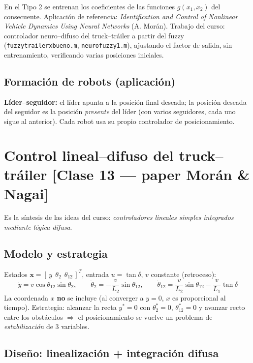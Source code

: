 \documentclass[11pt,a4paper]{article}
\begin{document}
En el Tipo 2 se entrenan los coeficientes de las funciones $g(x_1,x_2)$ del consecuente. Aplicación de referencia: \emph{Identification and Control of Nonlinear Vehicle Dynamics Using Neural Networks} (A. Morán). Trabajo del curso: controlador neuro--difuso del truck--tráiler a partir del fuzzy (\texttt{fuzzytrailerxbueno.m}, \texttt{neurofuzzy1.m}), ajustando el factor de salida, sin entrenamiento, verificando varias posiciones iniciales.

\subsection{Formación de robots (aplicación)}

\textbf{Líder--seguidor:} el líder apunta a la posición final deseada; la posición deseada del seguidor es la posición \emph{presente} del líder (con varios seguidores, cada uno sigue al anterior). Cada robot usa su propio controlador de posicionamiento.

\section{Control lineal--difuso del truck--tráiler \hfill {\normalsize [Clase 13 — paper Morán \& Nagai]}}

Es la síntesis de las ideas del curso: \emph{controladores lineales simples integrados mediante lógica difusa}.

\subsection{Modelo y estrategia}

Estados $\mathbf x=[\,y\ \ \theta_2\ \ \theta_{12}\,]^T$, entrada $u=\tan\delta$, $v$ constante (retroceso):
\[
\dot y=v\cos\theta_{12}\sin\theta_2,\qquad
\dot\theta_2=-\frac{v}{L_2}\sin\theta_{12},\qquad
\dot\theta_{12}=\frac{v}{L_2}\sin\theta_{12}-\frac{v}{L_1}\tan\delta
\]
La coordenada $x$ \textbf{no} se incluye (al converger a $y=0$, $x$ es proporcional al tiempo). Estrategia: alcanzar la recta $y^{*}=0$ con $\theta_2^{*}=0$, $\theta_{12}^{*}=0$ y avanzar recto entre los obstáculos $\Rightarrow$ el posicionamiento se vuelve un problema de \emph{estabilización} de 3 variables.

\subsection{Diseño: linealización + integración difusa}
\end{document}
